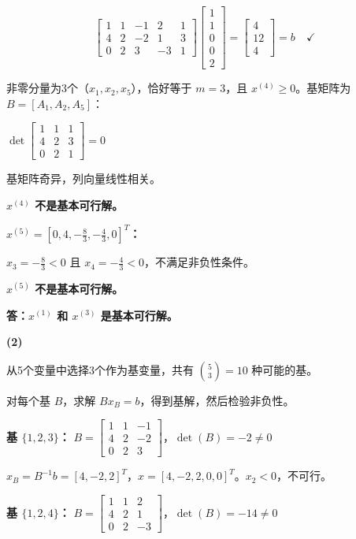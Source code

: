 \documentclass[12pt,a4paper]{article}
\begin{document}
\[
\left[\begin{array}{ccccc}
1 & 1 & -1 & 2 & 1 \\
4 & 2 & -2 & 1 & 3 \\
0 & 2 & 3 & -3 & 1
\end{array}\right]
\left[\begin{array}{c}
1 \\ 1 \\ 0 \\ 0 \\ 2
\end{array}\right]
=
\left[\begin{array}{c}
4 \\ 12 \\ 4
\end{array}\right] = b \quad \checkmark
\]

非零分量为3个（$x_1, x_2, x_5$），恰好等于 $m=3$，且 $x^{(4)} \geq 0$。基矩阵为 $B = [A_1, A_2, A_5]$：

$\det\left[\begin{array}{ccc} 1 & 1 & 1 \\ 4 & 2 & 3 \\ 0 & 2 & 1 \end{array}\right]  = 0$

基矩阵奇异，列向量线性相关。

\textbf{$x^{(4)}$ 不是基本可行解。}

\textbf{$x^{(5)} = [0, 4, -\frac{8}{3}, -\frac{4}{3}, 0]^T$：}

$x_3 = -\frac{8}{3} < 0$ 且 $x_4 = -\frac{4}{3} < 0$，不满足非负性条件。

\textbf{$x^{(5)}$ 不是基本可行解。}

\textbf{答：$x^{(1)}$ 和 $x^{(3)}$ 是基本可行解。}

\textbf{(2) }

从5个变量中选择3个作为基变量，共有 $\binom{5}{3} = 10$ 种可能的基。

对每个基 $B$，求解 $Bx_B = b$，得到基解，然后检验非负性。

\textbf{基 $\{1,2,3\}$：} $B = \left[\begin{array}{ccc} 1 & 1 & -1 \\ 4 & 2 & -2 \\ 0 & 2 & 3 \end{array}\right]$，$\det(B) = -2 \neq 0$

$x_B = B^{-1}b = [4, -2, 2]^T$，$x = [4, -2, 2, 0, 0]^T$。$x_2 < 0$，不可行。

\textbf{基 $\{1,2,4\}$：} $B = \left[\begin{array}{ccc} 1 & 1 & 2 \\ 4 & 2 & 1 \\ 0 & 2 & -3 \end{array}\right]$，$\det(B) = -14 \neq 0$
\end{document}
